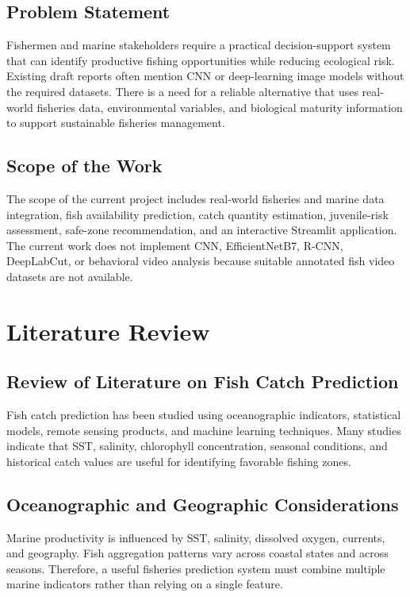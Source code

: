\documentclass[12pt,a4paper]{report}
\begin{document}
\section{Problem Statement}
Fishermen and marine stakeholders require a practical decision-support system that can identify productive fishing opportunities while reducing ecological risk. Existing draft reports often mention CNN or deep-learning image models without the required datasets. There is a need for a reliable alternative that uses real-world fisheries data, environmental variables, and biological maturity information to support sustainable fisheries management.

\section{Scope of the Work}
The scope of the current project includes real-world fisheries and marine data integration, fish availability prediction, catch quantity estimation, juvenile-risk assessment, safe-zone recommendation, and an interactive Streamlit application. The current work does not implement CNN, EfficientNetB7, R-CNN, DeepLabCut, or behavioral video analysis because suitable annotated fish video datasets are not available.

\chapter{Literature Review}

\section{Review of Literature on Fish Catch Prediction}
Fish catch prediction has been studied using oceanographic indicators, statistical models, remote sensing products, and machine learning techniques. Many studies indicate that SST, salinity, chlorophyll concentration, seasonal conditions, and historical catch values are useful for identifying favorable fishing zones.

\section{Oceanographic and Geographic Considerations}
Marine productivity is influenced by SST, salinity, dissolved oxygen, currents, and geography. Fish aggregation patterns vary across coastal states and across seasons. Therefore, a useful fisheries prediction system must combine multiple marine indicators rather than relying on a single feature.
\end{document}
